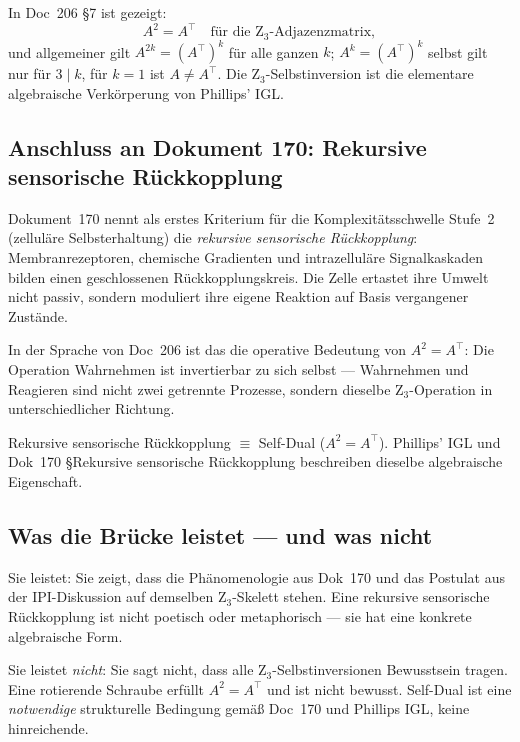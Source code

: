 In Doc~206 \S7 ist gezeigt:
\begin{equation}
A^2 = A^\top \quad \text{für die Z}_3\text{-Adjazenzmatrix},
\end{equation}
und allgemeiner gilt $A^{2k} = (A^\top)^k$ für alle ganzen $k$; $A^k = (A^\top)^k$ selbst gilt nur für $3 \mid k$, für $k = 1$ ist $A \neq A^\top$. Die Z$_3$-Selbstinversion ist die elementare algebraische Verkörperung von Phillips' IGL.

\subsection{Anschluss an Dokument 170: Rekursive sensorische Rückkopplung}

Dokument~170 nennt als erstes Kriterium für die Komplexitätsschwelle Stufe~2 (zelluläre Selbsterhaltung) die \emph{rekursive sensorische Rückkopplung}: Membranrezeptoren, chemische Gradienten und intrazelluläre Signalkaskaden bilden einen geschlossenen Rückkopplungskreis. Die Zelle ertastet ihre Umwelt nicht passiv, sondern moduliert ihre eigene Reaktion auf Basis vergangener Zustände.

In der Sprache von Doc~206 ist das die operative Bedeutung von $A^2 = A^\top$: Die Operation \glqq Wahrnehmen\grqq{} ist invertierbar zu sich selbst — Wahrnehmen und Reagieren sind nicht zwei getrennte Prozesse, sondern dieselbe Z$_3$-Operation in unterschiedlicher Richtung.

\begin{insightBox}
Rekursive sensorische Rückkopplung $\equiv$ Self-Dual ($A^2 = A^\top$). Phillips' IGL und Dok~170 \S{}Rekursive sensorische Rückkopplung beschreiben dieselbe algebraische Eigenschaft.
\end{insightBox}

\subsection{Was die Brücke leistet — und was nicht}

Sie leistet: Sie zeigt, dass die Phänomenologie aus Dok~170 und das Postulat aus der IPI-Diskussion auf demselben Z$_3$-Skelett stehen. Eine \glqq rekursive sensorische Rückkopplung\grqq{} ist nicht poetisch oder metaphorisch — sie hat eine konkrete algebraische Form.

Sie leistet \emph{nicht}: Sie sagt nicht, dass alle Z$_3$-Selbstinversionen Bewusstsein tragen. Eine rotierende Schraube erfüllt $A^2 = A^\top$ und ist nicht bewusst. Self-Dual ist eine \emph{notwendige} strukturelle Bedingung gemäß Doc~170 und Phillips IGL, keine hinreichende.

